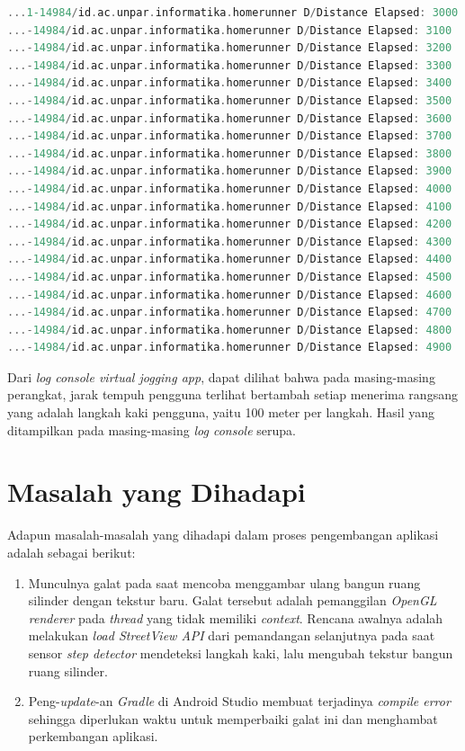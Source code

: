 \begin{lstlisting}[language=C,frame=single,caption=\textit{Log console} yang Menampilkan Jarak Tempuh Pengguna pada Perangkat 2,label=zenfone2log]
...1-14984/id.ac.unpar.informatika.homerunner D/Distance Elapsed: 3000 
...-14984/id.ac.unpar.informatika.homerunner D/Distance Elapsed: 3100 
...-14984/id.ac.unpar.informatika.homerunner D/Distance Elapsed: 3200 
...-14984/id.ac.unpar.informatika.homerunner D/Distance Elapsed: 3300 
...-14984/id.ac.unpar.informatika.homerunner D/Distance Elapsed: 3400 
...-14984/id.ac.unpar.informatika.homerunner D/Distance Elapsed: 3500 
...-14984/id.ac.unpar.informatika.homerunner D/Distance Elapsed: 3600 
...-14984/id.ac.unpar.informatika.homerunner D/Distance Elapsed: 3700 
...-14984/id.ac.unpar.informatika.homerunner D/Distance Elapsed: 3800 
...-14984/id.ac.unpar.informatika.homerunner D/Distance Elapsed: 3900 
...-14984/id.ac.unpar.informatika.homerunner D/Distance Elapsed: 4000 
...-14984/id.ac.unpar.informatika.homerunner D/Distance Elapsed: 4100 
...-14984/id.ac.unpar.informatika.homerunner D/Distance Elapsed: 4200 
...-14984/id.ac.unpar.informatika.homerunner D/Distance Elapsed: 4300 
...-14984/id.ac.unpar.informatika.homerunner D/Distance Elapsed: 4400 
...-14984/id.ac.unpar.informatika.homerunner D/Distance Elapsed: 4500 
...-14984/id.ac.unpar.informatika.homerunner D/Distance Elapsed: 4600 
...-14984/id.ac.unpar.informatika.homerunner D/Distance Elapsed: 4700 
...-14984/id.ac.unpar.informatika.homerunner D/Distance Elapsed: 4800 
...-14984/id.ac.unpar.informatika.homerunner D/Distance Elapsed: 4900
\end{lstlisting}

Dari \textit{log console virtual jogging app}, dapat dilihat bahwa pada masing-masing perangkat, jarak tempuh pengguna terlihat bertambah setiap menerima rangsang yang adalah langkah  kaki pengguna, yaitu 100 meter per langkah. Hasil yang ditampilkan pada masing-masing \textit{log console} serupa. 


\section{Masalah yang Dihadapi}
Adapun masalah-masalah yang dihadapi dalam proses pengembangan aplikasi adalah sebagai berikut:

\begin{enumerate}
	\item Munculnya galat pada saat mencoba menggambar ulang bangun ruang silinder dengan tekstur baru. Galat tersebut adalah pemanggilan \textit{OpenGL renderer} pada \textit{thread} yang tidak memiliki \textit{context}. Rencana awalnya adalah melakukan \textit{load StreetView API} dari pemandangan selanjutnya pada saat sensor \textit{step detector} mendeteksi langkah kaki, lalu mengubah tekstur bangun ruang silinder. 
	
	\item Peng-\textit{update}-an \textit{Gradle} di Android Studio membuat terjadinya \textit{compile error} sehingga diperlukan waktu untuk memperbaiki galat ini dan menghambat perkembangan aplikasi. 
\end{enumerate}

